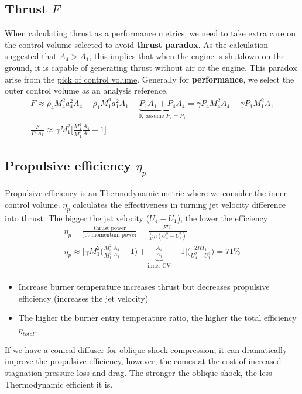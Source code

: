 \documentclass[a4paper,10pt]{article}
\begin{document}
\subsection{Thrust $F$}
When calculating thrust as a performance metrics, we need to take extra care on the control volume selected to avoid \textbf{thrust paradox}. As the calculation suggested that $A_4>A_1$, this implies that when the engine is shutdown on the ground, it is capable of generating thrust without air or the engine. This paradox arise from the \underline{pick of control volume}. Generally for \textbf{performance}, we select the outer control volume as an analysis reference. 
\begin{gather*}
    F\approx\rho_4M_4^2a_4^2A_4-\rho_1M_1^2a_1^2A_1-\underbrace{P_1A_1+P_4A_4}_{0,\text{ assume }P_4=P_1}=\gamma P_4M_4^2A_4-\gamma P_1M_1^2A_1\\[0.2cm]
    \frac{F}{P_1A_1}\approx\gamma M_1^2\Big[\frac{M_4^2}{M_1^2}\frac{A_4}{A_1}-1\Big]
\end{gather*}

\vspace*{-0.3cm}
\subsection{Propulsive efficiency $\eta_p$}
Propulsive efficiency is an Thermodynamic metric where we consider the inner control volume. $\eta_p$ calculates the effectiveness in turning jet velocity difference into thrust. The bigger the jet velocity ($U_4-U_1$), the lower the efficiency 
\begin{gather*}
    \eta_p = \frac{\text{thrust power}}{\text{jet momentum power}} = \frac{FU_1}{\frac{1}{2}\dot{m}(U_4^2-U_1^2)}\\[0.15cm]
    \eta_p\approx \Bigg[\gamma M_1^2\Big(\frac{M_4^2}{M_1^2}\frac{A_4}{A_1}-1\Big)+\underbrace{\frac{A_4}{A_1}}_\text{inner CV}-1\Bigg]\Big(\frac{2RT_1}{U_4^2-U_1^2}\Big) = 71\%\\
\end{gather*}

\vspace*{-0.7cm}
\begin{itemize}
    \item Increase burner temperature increases thrust but decreases propulsive efficiency (increases the jet velocity)
    \item The higher the burner entry temperature ratio, the higher the total efficiency $\eta_{total}$.
\end{itemize}
If we have a conical diffuser for oblique shock compression, it can dramatically improve the propulsive efficiency, however, the comes at the cost of increased stagnation pressure loss and drag. The stronger the oblique shock, the less Thermodynamic efficient it is. 
\end{document}
